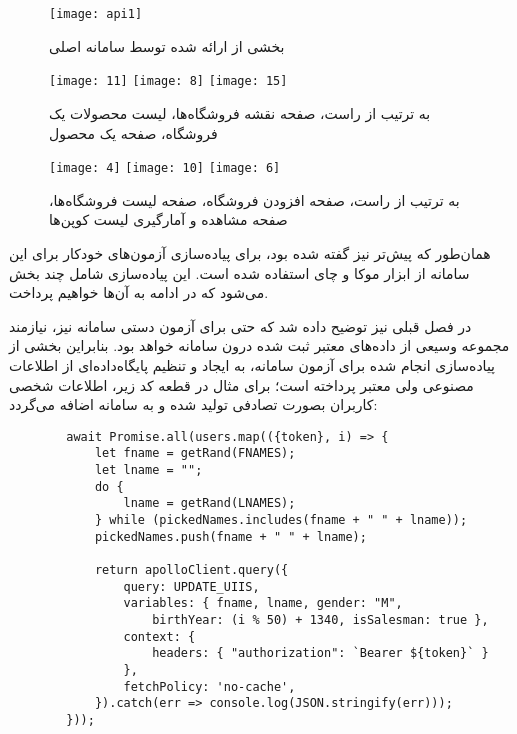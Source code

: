 \begin{figure}[H]
	\centering
	\texttt{[image: api1]}
	\caption{بخشی از  ارائه شده توسط سامانه اصلی}
	\label{fig:api1}
\end{figure}




\newpage


\begin{figure}[H]
	\centering
	\texttt{[image: 11]}
	\texttt{[image: 8]}
	\texttt{[image: 15]}
	\caption{به ترتیب از راست، صفحه نقشه فروشگاه‌ها، لیست محصولات یک فروشگاه، صفحه یک محصول}
	\label{fig:app1}
\end{figure}

\begin{figure}[H]
	\centering
	\texttt{[image: 4]}
	\texttt{[image: 10]}
	\texttt{[image: 6]}
	\caption{به ترتیب از راست، صفحه افزودن فروشگاه، صفحه لیست فروشگاه‌ها، صفحه مشاهده و آمارگیری لیست کوپن‌ها}
	\label{fig:app2}
\end{figure}


همان‌طور که پیش‌تر نیز گفته شده بود، برای پیاده‌سازی آزمون‌های خودکار برای این سامانه از ابزار موکا و چای استفاده شده است. این پیاده‌سازی شامل چند بخش می‌شود که در ادامه به آن‌ها خواهیم پرداخت.


در فصل قبلی نیز توضیح داده شد که حتی برای آزمون دستی سامانه نیز،‌ نیازمند مجموعه وسیعی از داده‌های معتبر ثبت شده درون سامانه خواهد بود. بنابراین بخشی از پیاده‌سازی انجام شده برای آزمون سامانه، به ایجاد و تنظیم  پایگاه‌داده‌ای از اطلاعات مصنوعی ولی معتبر پرداخته است؛ برای مثال در قطعه کد زیر، اطلاعات شخصی کاربران بصورت تصادفی تولید شده و به سامانه اضافه می‌گردد:
\begin{LTR}
	\begin{verbatim}
		await Promise.all(users.map(({token}, i) => {
		    let fname = getRand(FNAMES);
		    let lname = "";
		    do {
		        lname = getRand(LNAMES);
		    } while (pickedNames.includes(fname + " " + lname));
		    pickedNames.push(fname + " " + lname);
			
		    return apolloClient.query({
		        query: UPDATE_UIIS,
		        variables: { fname, lname, gender: "M",
		            birthYear: (i % 50) + 1340, isSalesman: true },
		        context: {
		            headers: { "authorization": `Bearer ${token}` }
		        },
		        fetchPolicy: 'no-cache',
		    }).catch(err => console.log(JSON.stringify(err)));
		}));
	\end{verbatim}
\end{LTR}


